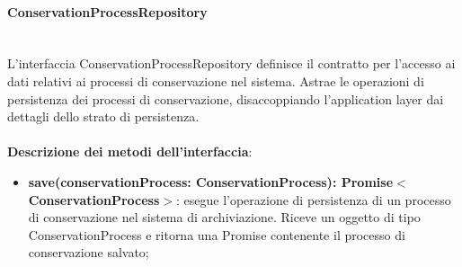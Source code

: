 \documentclass[a4paper,12pt]{article}
\begin{document}
{{{                %
                \paragraph{ConservationProcessRepository}\label{par:ConservationProcessRepository}\mbox{}\\
                L'interfaccia ConservationProcessRepository definisce il contratto per l'accesso ai dati relativi ai processi di conservazione nel sistema. Astrae le operazioni di persistenza dei processi di conservazione, disaccoppiando l'application layer dai dettagli dello strato di persistenza.\\
                \\
              \noindent \textbf{Descrizione dei metodi dell'interfaccia}:
                \begin{itemize}
                    \item \textbf{save(conservationProcess: ConservationProcess): Promise$<$ConservationProcess$>$}: esegue l'operazione di persistenza di un processo di conservazione nel sistema di archiviazione. Riceve un oggetto di tipo ConservationProcess e ritorna una Promise contenente il processo di conservazione salvato;
                \end{itemize}
}}}
\end{document}
